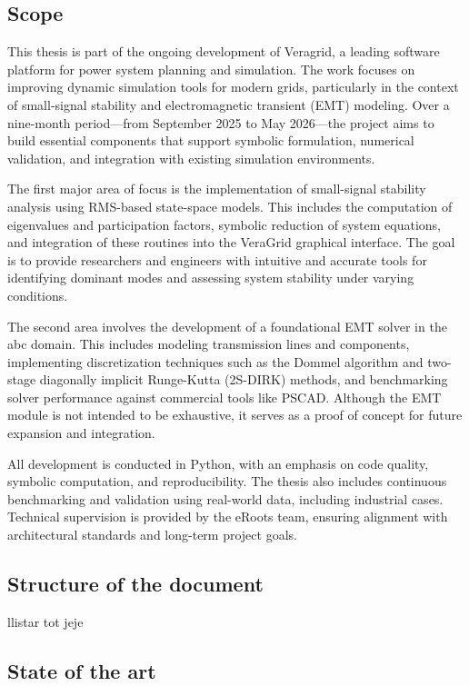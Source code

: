 \subsection{Scope}

This thesis is part of the ongoing development of Veragrid, a leading software platform for power system planning and simulation. 
The work focuses on improving dynamic simulation tools for modern grids, particularly in the context of small-signal stability and electromagnetic transient (EMT) modeling.
Over a nine-month period—from September 2025 to May 2026—the project aims to build essential components that support symbolic formulation, numerical validation,
and integration with existing simulation environments. 

The first major area of focus is the implementation of small-signal stability analysis using RMS-based state-space models.
This includes the computation of eigenvalues and participation factors, symbolic reduction of system equations,
and integration of these routines into the VeraGrid graphical interface.
The goal is to provide researchers and engineers with intuitive and accurate tools for identifying dominant modes and assessing system stability under varying conditions.

The second area involves the development of a foundational EMT solver in the abc domain. This includes modeling transmission lines and components,
implementing discretization techniques such as the Dommel algorithm and two-stage diagonally implicit Runge-Kutta (2S-DIRK) methods,
and benchmarking solver performance against commercial tools like PSCAD. Although the EMT module is not intended to be exhaustive,
it serves as a proof of concept for future expansion and integration.

All development is conducted in Python, with an emphasis on code quality, symbolic computation, and reproducibility.
The thesis also includes continuous benchmarking and validation using real-world data, including industrial cases.
Technical supervision is provided by the eRoots team, ensuring alignment with architectural standards and long-term project goals.

\subsection{Structure of the document}

llistar tot jeje

\subsection{State of the art}

